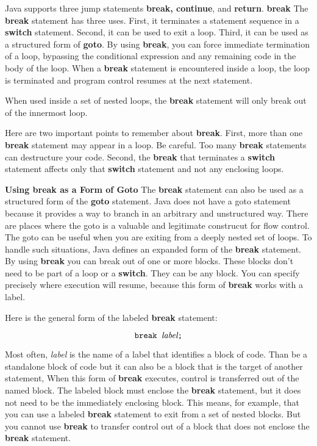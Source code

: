Java supports three jump statements {\bf break, continue}, and {\bf return}.
\vskip 1cm
{\bf break}
\vskip 3mm
The {\bf break} statement has three uses. First, it terminates a statement sequence in a {\bf switch} statement. Second, it can be used to exit a loop. Third, it can be used as a structured form of {\bf goto}.
\vskip 1mm
By using {\bf break}, you can force immediate termination of a loop, bypassing the conditional expression and any remaining code in the body of the loop. When a {\bf break} statement is encountered inside a loop, the loop is terminated and program control resumes at the next statement.

\vskip 1mm
When used inside a set of nested loops, the {\bf break} statement will only break out of the innermost loop.

\vskip 1mm
Here are two important points to remember about {\bf break}. First, more than one {\bf break} statement may appear in a loop. Be careful. Too many {\bf break} statements can destructure your code. Second, the {\bf break} that terminates a {\bf switch} statement affects only that {\bf switch} statement and not any enclosing loops.

\vskip 1in
\filbreak
{\bf Using break as a Form of Goto}
\vskip 3mm
The {\bf break} statement can also be used as a structured form of the {\bf goto} statement. Java does not have a goto statement because it provides a way to branch in an arbitrary and unstructured way. There are places where the goto is a valuable and legitimate construcut for flow control. The goto can be useful when you are exiting from a deeply nested set of loops. To handle such situations, Java defines an expanded form of the {\bf break} statement. By using {\bf break} you can break out of one or more blocks. These blocks don't need to be part of a loop or a {\bf switch}. They can be any block. You can specify precisely where execution will resume, because this form of {\bf break} works with a label.

\vskip 1mm
Here is the general form of the labeled {\bf break} statement:

$$\hbox{\tt break {\it label};}$$

\vskip 1mm
Most often, {\it label} is the name of a label that identifies a block of code. Than be a standalone block of code but it can also be a block that is the target of another statement, When this form of {\bf break} executes, control is transferred out of the named block. The labeled block must enclose the {\bf break} statement, but it does not need to be the immediately enclosing block. This means, for example, that you can use a labeled {\bf break} statement to exit from a set of nested blocks. But you cannot use {\bf break} to transfer control out of a block that does not enclose the {\bf break} statement.

